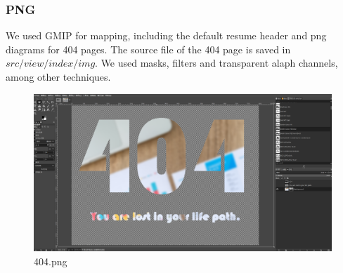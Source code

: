 \documentclass[11pt]{article}
\begin{document}
\begin{spacing}{1.0}
	\subsubsection{PNG}
	We used GMIP for mapping, including the default resume header and png diagrams for 404 pages. The source file of the 404 page is saved in $src/view/index/img$. We used masks, filters and transparent alaph channels, among other techniques.
	\begin{figure}[H]
		\centering
		\includegraphics[scale=.3]{figures/404.png}
		\caption{404.png}
		\label{fig:13}
	\end{figure}
	

\end{spacing}
\end{document}
